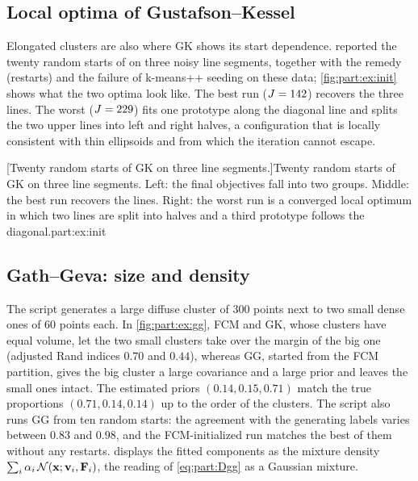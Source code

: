 \subsection{Local optima of Gustafson--Kessel}\label{sec:part:ex:init}

Elongated clusters are also where GK shows its start dependence.  reported the twenty random starts of  on three noisy line segments, together with the remedy (restarts) and the failure of k-means++ seeding on these data; \cref{fig:part:ex:init} shows what the two optima look like. The best run ($J=142$) recovers the three lines. The worst ($J=229$) fits one prototype along the diagonal line and splits the two upper lines into left and right halves, a configuration that is locally consistent with thin ellipsoids and from which the iteration cannot escape.

[Twenty random starts of GK on three line segments.]{Twenty random starts of GK on three line segments. Left: the final objectives fall into two groups. Middle: the best run recovers the lines. Right: the worst run is a converged local optimum in which two lines are split into halves and a third prototype follows the diagonal.}{part:ex:init}

\subsection{Gath--Geva: size and density}\label{sec:part:ex:gg}

The script  generates a large diffuse cluster of 300 points next to two small dense ones of 60 points each. In \cref{fig:part:ex:gg}, FCM and GK, whose clusters have equal volume, let the two small clusters take over the margin of the big one (adjusted Rand indices $0.70$ and $0.44$), whereas GG, started from the FCM partition, gives the big cluster a large covariance and a large prior and leaves the small ones intact. The estimated priors $(0.14, 0.15, 0.71)$ match the true proportions $(0.71, 0.14, 0.14)$ up to the order of the clusters. The script also runs GG from ten random starts: the agreement with the generating labels varies between $0.83$ and $0.98$, and the FCM-initialized run matches the best of them without any restarts.  displays the fitted components as the mixture density $\sum_i\alpha_i\,\mathcal{N}(\mathbf{x};\mathbf{v}_i,\mathbf{F}_i)$, the reading of \eqref{eq:part:Dgg} as a Gaussian mixture.

